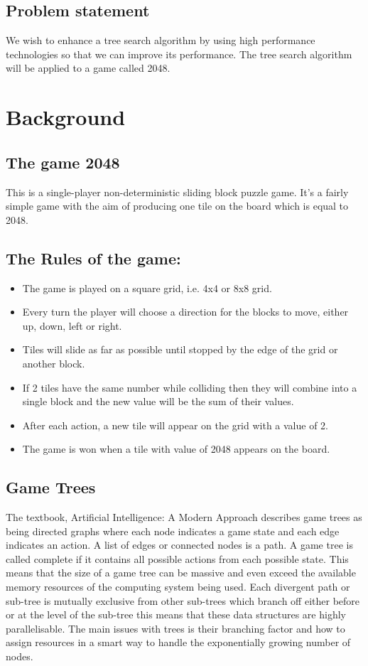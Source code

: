 \documentclass[a4paper]{article}
\begin{document}
\subsection{Problem statement}
We wish to enhance a tree search algorithm by using high performance technologies so that we can improve its performance. The tree search algorithm will be applied to a game called 2048.

\section{Background}
\subsection{The game 2048}
This is a single-player non-deterministic sliding block puzzle game. It’s a fairly simple game with the aim of producing one tile on the board which is equal to 2048. \cite{rules}

\subsection{The Rules of the game:}
	\begin{itemize}
		\item The game is played on a square grid, i.e. 4x4 or 8x8 grid.
		\item Every turn the player will choose a direction for the blocks to move, either up, down, left or right.
		\item Tiles will slide as far as possible until stopped by the edge of the grid or another block. 
		\item If 2 tiles have the same number while colliding then they will combine into a single block and the new value will be the sum of their values.
		\item After each action, a new tile will appear on the grid with a value of 2.
		\item The game is won when a tile with value of 2048 appears on the board. 
	\end{itemize}

\subsection{Game Trees}
The textbook, Artificial Intelligence: A Modern Approach \cite{AIModern} describes game trees as being directed graphs where each node indicates a game state and each edge indicates an action. A list of edges or connected nodes is a path. A game tree is called complete if it contains all possible actions from each possible state. This means that the size of a game tree can be massive and even exceed the available memory resources of the computing system being used. Each divergent path or sub-tree is mutually exclusive from other sub-trees which branch off either before or at the level of the sub-tree this means that these data structures are highly parallelisable. The main issues with trees is their branching factor and how to assign resources in a smart way to handle the exponentially growing number of nodes.
\end{document}
